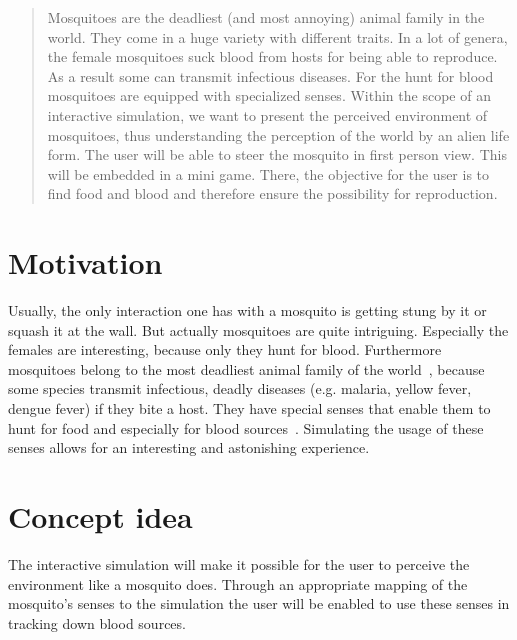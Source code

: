 \documentclass{acm_proc_article-sp}
\begin{document}
\maketitle
\begin{abstract}
Mosquitoes are the deadliest (and most annoying) animal family in the world. They come in a huge variety with different traits. In a lot of genera, the female mosquitoes suck blood from hosts for being able to reproduce. As a result some can transmit infectious diseases. For the hunt for blood mosquitoes are equipped with specialized senses. Within the scope of an interactive simulation, we want to present the perceived environment of mosquitoes, thus understanding the perception of the world by an alien life form. The user will be able to steer the mosquito in first person view. This will be embedded in a mini game. There, the objective for the user is to find food and blood and therefore ensure the possibility for reproduction.
\end{abstract}






\section{Motivation}
Usually, the only interaction one has with a mosquito is getting stung by it or squash it at the wall. But actually mosquitoes are quite intriguing. Especially the females are interesting, because only they hunt for blood. Furthermore mosquitoes belong to the most deadliest animal family of the world~\cite{billG}, because some species transmit infectious, deadly diseases (e.g. malaria, yellow fever, dengue fever) if they bite a host. They have special senses that enable them to hunt for food and especially for blood sources~\cite{wiki_mosq}. Simulating the usage of these senses allows for an interesting and astonishing experience.


\section{Concept idea}
The interactive simulation will make it possible for the user to perceive the environment like a mosquito does. Through an appropriate mapping of the mosquito's senses to the simulation the user will be enabled to use these senses in tracking down blood sources.
\end{document}
